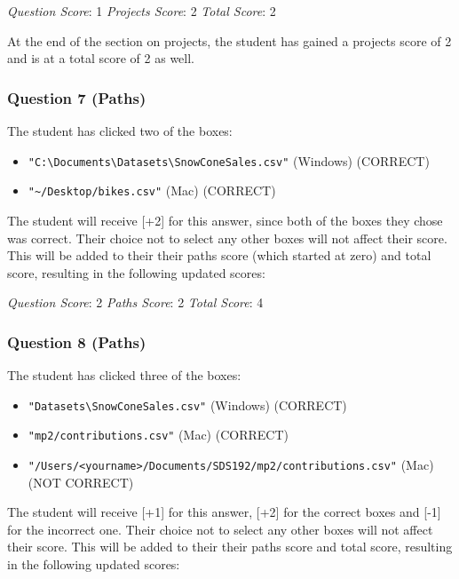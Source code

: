 \documentclass[12pt,twoside]{reedthesis}
\providecommand{\tightlist}{%
  \setlength{\itemsep}{0pt}\setlength{\parskip}{0pt}}
\begin{document}
\emph{Question Score}: 1 \emph{Projects Score}: 2 \emph{Total Score}: 2

At the end of the section on projects, the student has gained a projects score of 2 and is at a total score of 2 as well.

\hypertarget{question-7-paths-1}{%
\subsubsection{Question 7 (Paths)}\label{question-7-paths-1}}

The student has clicked two of the boxes:
\begin{itemize}
\tightlist
\item
  \texttt{"C:\textbackslash{}Documents\textbackslash{}Datasets\textbackslash{}SnowConeSales.csv"} (Windows) (CORRECT)
\item
  \texttt{"\textasciitilde{}/Desktop/bikes.csv"} (Mac) (CORRECT)
\end{itemize}
The student will receive {[}+2{]} for this answer, since both of the boxes they chose was correct. Their choice not to select any other boxes will not affect their score. This will be added to their their paths score (which started at zero) and total score, resulting in the following updated scores:

\emph{Question Score}: 2 \emph{Paths Score}: 2 \emph{Total Score}: 4

\hypertarget{question-8-paths-1}{%
\subsubsection{Question 8 (Paths)}\label{question-8-paths-1}}

The student has clicked three of the boxes:
\begin{itemize}
\tightlist
\item
  \texttt{"Datasets\textbackslash{}SnowConeSales.csv"} (Windows) (CORRECT)
\item
  \texttt{"mp2/contributions.csv"} (Mac) (CORRECT)
\item
  \texttt{"/Users/\textless{}yourname\textgreater{}/Documents/SDS192/mp2/contributions.csv"} (Mac) (NOT CORRECT)
\end{itemize}
The student will receive {[}+1{]} for this answer, {[}+2{]} for the correct boxes and {[}-1{]} for the incorrect one. Their choice not to select any other boxes will not affect their score. This will be added to their their paths score and total score, resulting in the following updated scores:
\end{document}
